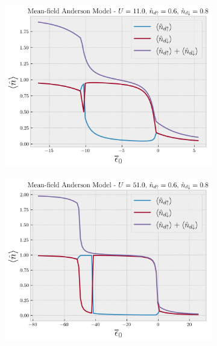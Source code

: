 \documentclass[a4paper,fleqn,12pt]{article}
\begin{document}
\begin{figure}[H]
\centering
\begin{subfigure}{.5\textwidth}
  \centering
  \includegraphics[width=\linewidth]{fig/plot-U_11-up_0.6-down_0.8.png}
\end{subfigure}%
\begin{subfigure}{.5\textwidth}
  \centering
  \includegraphics[width=\linewidth]{fig/plot-U_51-up_0.6-down_0.8.png}
\end{subfigure}
\end{figure}

\n\n\n\n
\end{document}
